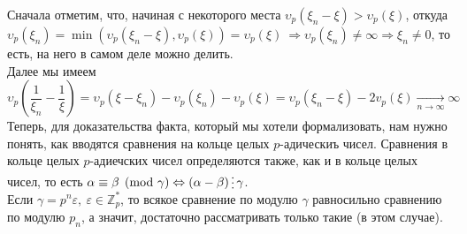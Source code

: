 \documentclass[11pt]{article}
\begin{document}
    Сначала отметим, что, начиная с некоторого места $ \upsilon_p{(\xi_n - \xi)} > \upsilon_p{(\xi)}$, откуда $ \upsilon_p{(\xi_n)} = \min( \upsilon_p{(\xi_n - \xi)}, \upsilon_p{(\xi)}) = \upsilon_p{(\xi)} \ \Rightarrow \upsilon_p{(\xi_n)} \neq \infty \Rightarrow \xi_n \neq 0$,
    то есть, на него в самом деле можно делить. \\

    Далее мы имеем
    \[ \upsilon_p{\left(\frac{1}{\xi_n} - \frac{1}{\xi} \right)} = \upsilon_p{(\xi - \xi_n)} - \upsilon_p{(\xi_n)} - \upsilon_p{(\xi)} = \upsilon_p{(\xi_n - \xi)} - 2v_p(\xi) \xrightarrow[n \to \infty]{} \infty \]
    Теперь, для доказательства факта, который мы хотели формализовать, нам нужно понять, как вводятся сравнения на кольце целых $p$-адическиъ чисел.
    Сравнения в кольце целых $p$-адиечских чисел определяются также, как и в кольце целых чисел, то есть $\alpha \equiv \beta \pmod{\gamma} \Leftrightarrow (\alpha - \beta) \divisible \gamma$.\\

    Если $\gamma = p^n \varepsilon, \ \varepsilon \in \mathbb{Z}_p^{*}$, то всякое сравнение по модулю $\gamma$ равносильно сравнению по модулю $p_n$, а значит,
    достаточно рассматривать только такие (в этом случае).
\end{document}
